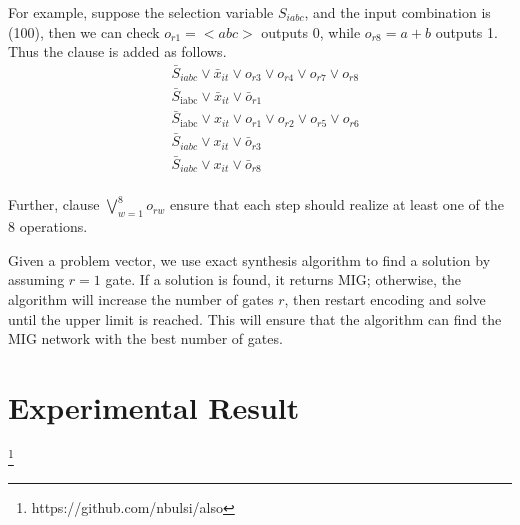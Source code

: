 \documentclass[conference,letterpaper]{IEEEtran}
\begin{document}
For example, suppose the selection variable $S_{i a b c}$, and the input combination is (100), then we can check $o_{r 1}=<abc>$ outputs 0, while $o_{r 8}=a+b$ outputs 1. Thus the clause is added as follows.
\begin{equation}                     %
\begin{split}
&\bar{S}_{i a b c} \vee \bar{x}_{i t} \vee o_{r 3} \vee o_{r 4} \vee o_{r 7} \vee o_{r 8} \\
&\bar{S}_{\text {iabc}} \vee \bar{x}_{i t} \vee \bar{o}_{r 1} \\
&\bar{S}_{\text {iabc}} \vee x_{i t} \vee {o}_{r 1} \vee{o}_{r 2} \vee{o}_{r 5} \vee{o}_{r 6}\\
&\bar{S}_{i a b c} \vee x_{i t} \vee \bar{o}_{r 3}\\
&\bar{S}_{i a b c} \vee x_{i t} \vee \bar{o}_{r 8}\\
\end{split}
\end{equation}

Further, clause $\bigvee_{w=1}^{8} o_{r w}$ ensure that each step should realize at least one of the 8 operations.

Given a problem vector, we use exact synthesis algorithm to find a solution by assuming $r= 1$ gate. If a solution is found, it returns MIG; otherwise, the algorithm will increase the number of gates $r$, then restart encoding and solve until the upper limit is reached. This will ensure that the algorithm can find the MIG network with the best number of gates.

\section*{Experimental Result}
\footnote{https://github.com/nbulsi/also} 


%

\end{document}

